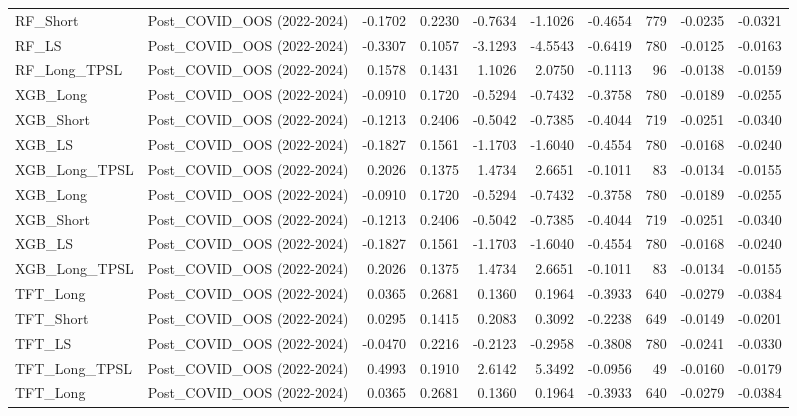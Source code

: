 \begin{tabular}{llrrrrrrrr}
\cline{1-10}
RF\_Short & Post\_COVID\_OOS (2022-2024) & -0.1702 & 0.2230 & -0.7634 & -1.1026 & -0.4654 & 779 & -0.0235 & -0.0321 \\
\cline{1-10}
RF\_LS & Post\_COVID\_OOS (2022-2024) & -0.3307 & 0.1057 & -3.1293 & -4.5543 & -0.6419 & 780 & -0.0125 & -0.0163 \\
\cline{1-10}
RF\_Long\_TPSL & Post\_COVID\_OOS (2022-2024) & 0.1578 & 0.1431 & 1.1026 & 2.0750 & -0.1113 & 96 & -0.0138 & -0.0159 \\
\cline{1-10}
XGB\_Long & Post\_COVID\_OOS (2022-2024) & -0.0910 & 0.1720 & -0.5294 & -0.7432 & -0.3758 & 780 & -0.0189 & -0.0255 \\
\cline{1-10}
XGB\_Short & Post\_COVID\_OOS (2022-2024) & -0.1213 & 0.2406 & -0.5042 & -0.7385 & -0.4044 & 719 & -0.0251 & -0.0340 \\
\cline{1-10}
XGB\_LS & Post\_COVID\_OOS (2022-2024) & -0.1827 & 0.1561 & -1.1703 & -1.6040 & -0.4554 & 780 & -0.0168 & -0.0240 \\
\cline{1-10}
XGB\_Long\_TPSL & Post\_COVID\_OOS (2022-2024) & 0.2026 & 0.1375 & 1.4734 & 2.6651 & -0.1011 & 83 & -0.0134 & -0.0155 \\
\cline{1-10}
XGB\_Long & Post\_COVID\_OOS (2022-2024) & -0.0910 & 0.1720 & -0.5294 & -0.7432 & -0.3758 & 780 & -0.0189 & -0.0255 \\
\cline{1-10}
XGB\_Short & Post\_COVID\_OOS (2022-2024) & -0.1213 & 0.2406 & -0.5042 & -0.7385 & -0.4044 & 719 & -0.0251 & -0.0340 \\
\cline{1-10}
XGB\_LS & Post\_COVID\_OOS (2022-2024) & -0.1827 & 0.1561 & -1.1703 & -1.6040 & -0.4554 & 780 & -0.0168 & -0.0240 \\
\cline{1-10}
XGB\_Long\_TPSL & Post\_COVID\_OOS (2022-2024) & 0.2026 & 0.1375 & 1.4734 & 2.6651 & -0.1011 & 83 & -0.0134 & -0.0155 \\
\cline{1-10}
TFT\_Long & Post\_COVID\_OOS (2022-2024) & 0.0365 & 0.2681 & 0.1360 & 0.1964 & -0.3933 & 640 & -0.0279 & -0.0384 \\
\cline{1-10}
TFT\_Short & Post\_COVID\_OOS (2022-2024) & 0.0295 & 0.1415 & 0.2083 & 0.3092 & -0.2238 & 649 & -0.0149 & -0.0201 \\
\cline{1-10}
TFT\_LS & Post\_COVID\_OOS (2022-2024) & -0.0470 & 0.2216 & -0.2123 & -0.2958 & -0.3808 & 780 & -0.0241 & -0.0330 \\
\cline{1-10}
TFT\_Long\_TPSL & Post\_COVID\_OOS (2022-2024) & 0.4993 & 0.1910 & 2.6142 & 5.3492 & -0.0956 & 49 & -0.0160 & -0.0179 \\
\cline{1-10}
TFT\_Long & Post\_COVID\_OOS (2022-2024) & 0.0365 & 0.2681 & 0.1360 & 0.1964 & -0.3933 & 640 & -0.0279 & -0.0384 \\

\end{tabular}
